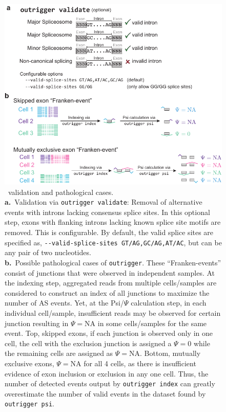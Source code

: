 \begin{figure}
  \centering
  \includegraphics[width=5.8in]{figures/outrigger_validate}
  \caption[\outrigger\, validation and pathological cases.]{
  \outrigger\, validation and pathological cases.\\
\textbf{a.}~Validation via \texttt{outrigger validate}: Removal of alternative events with introns lacking consensus splice sites. In this optional step, exons with flanking introns lacking known splice site motifs are removed. This is configurable. By default, the valid splice sites are specified as, \texttt{-{}-valid-splice-sites GT/AG,GC/AG,AT/AC}, but can be any pair of two nucleotides.\\
\textbf{b.}~Possible pathological cases of \texttt{outrigger}. These ``Franken-events'' consist of junctions that were observed in independent samples. At the indexing step, aggregated reads from multiple cells/samples are considered to construct an index of all junctions to maximize the number of AS events. Yet, at the Psi/$\Psi$ calculation step, in each individual cell/sample, insufficient reads may be observed for certain junction resulting in $\Psi=\text{NA}$ in some cells/samples for the same event. Top, skipped exons, if each junction is observed only in one cell, the cell with the exclusion junction is assigned a $\Psi=0$ while the remaining cells are assigned as $\Psi=\text{NA}$. Bottom, mutually exclusive exons, $\Psi=\text{NA}$ for all 4 cells, as there is insufficient evidence of exon inclusion or exclusion in any one cell. Thus, the number of detected events output by \texttt{outrigger index} can greatly overestimate the number of valid events in the dataset found by \texttt{outrigger psi}.
}
\label{fig:outrigger_validate_frankenevents}
\end{figure}



